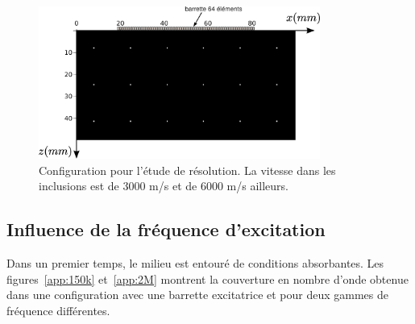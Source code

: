 \begin{figure}[!h]
	\centering
	\includegraphics[height=5cm]{img/vp_scat.png}
	\caption{Configuration pour l'étude de résolution. La vitesse dans les inclusions est de 3000 m/s et de 6000 m/s ailleurs. \label{app:config_reso}}
\end{figure}


\subsection{Influence de la fréquence d'excitation}

Dans un premier temps, le milieu est entouré de conditions absorbantes. Les figures~\ref{app:150k} et~\ref{app:2M} montrent la couverture en nombre d'onde obtenue dans une configuration avec une barrette excitatrice et pour deux gammes de fréquence différentes. 
    
